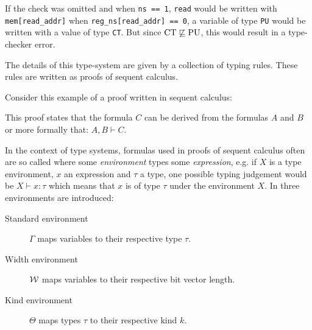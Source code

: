 \begin{example}
    If the check was omitted and when \lstinline{ns == 1}, \lstinline{read} would be written with \lstinline{mem[read_addr]} when \lstinline{reg_ns[read_addr] == 0}, a variable of type \lstinline{PU} would be written with a value of type \lstinline{CT}.
    But since $ \CT \not \sqsubseteq \PU $, this would result in a type-checker error.
\end{example}

The details of this type-system are given by a collection of typing rules.
These rules are written as proofs of sequent calculus.

\begin{example}
    Consider this example of a proof written in sequent calculus:
    \begin{prooftree}
    \end{prooftree}

    This proof states that the formula $ C $ can be derived from the formulas $ A $ and $ B $ or more formally that: $ A, B \vdash C $.
\end{example}

In the context of type systems, formulas used in proofs of sequent calculus often are so called  where some \textit{environment} types some \textit{expression}, e.g. if $ X $ is a type environment, $ x $ an expression and $ \tau $ a type, one possible typing judgement would be $ X \vdash x : \tau $ which means that $ x $ is of type $ \tau $ under the environment $ X $.
In \cite{Ferraiuolo17} three environments are introduced:

\begin{description}
    \item[Standard environment] $ \Gamma $ maps variables to their respective type $ \tau $.
    \item[Width environment] $ \W $ maps variables to their respective bit vector length.
    \item[Kind environment] $ \Theta $ maps types $ \tau $ to their respective kind $ k $.
\end{description}

